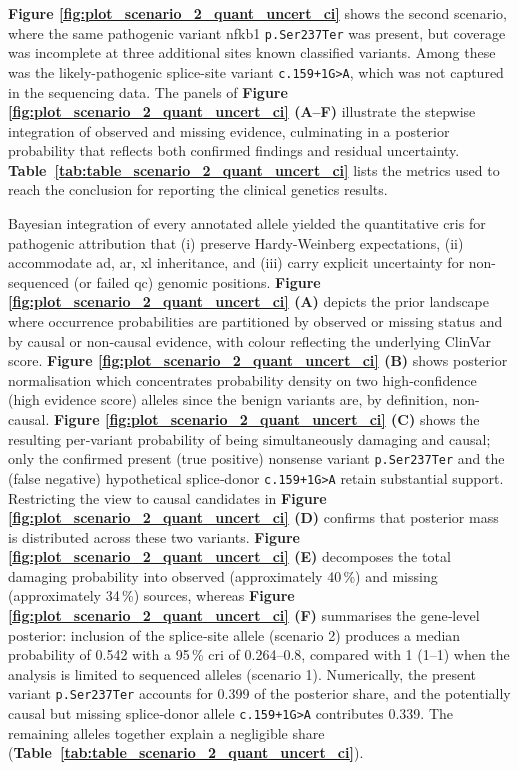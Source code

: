 \textbf{Figure \ref{fig:plot_scenario_2_quant_uncert_ci}} shows the second scenario, where the same pathogenic variant \ac{nfkb1} \texttt{p.Ser237Ter} was present, but coverage was incomplete at three additional sites known classified variants. 
Among these was the likely-pathogenic splice-site variant \texttt{c.159+1G{\small\textgreater}A}, which was not captured in the sequencing data. 
The panels of \textbf{Figure \ref{fig:plot_scenario_2_quant_uncert_ci} (A–F)} illustrate the stepwise integration of observed and missing evidence, culminating in a posterior probability that reflects both confirmed findings and residual uncertainty.
\textbf{Table~\ref{tab:table_scenario_2_quant_uncert_ci}} lists the metrics used to reach the conclusion for reporting the clinical genetics results.

Bayesian integration of every annotated allele yielded the quantitative \ac{cri}s for pathogenic attribution that (i) preserve Hardy-Weinberg expectations, (ii) accommodate \ac{ad}, \ac{ar}, \ac{xl} inheritance, and (iii) carry explicit uncertainty for non-sequenced (or failed \ac{qc}) genomic positions.  
\textbf{Figure \ref{fig:plot_scenario_2_quant_uncert_ci} (A)}
depicts the prior landscape where occurrence probabilities are partitioned by observed or missing status and by causal or non‑causal evidence, with colour reflecting the underlying ClinVar score.  
\textbf{Figure \ref{fig:plot_scenario_2_quant_uncert_ci} (B)} shows posterior normalisation which concentrates probability density on two high‑confidence (high evidence score) alleles since the benign variants are, by definition, non-causal.
\textbf{Figure \ref{fig:plot_scenario_2_quant_uncert_ci} (C)} shows the resulting per‑variant probability of being simultaneously damaging and causal; only the confirmed present (true positive) nonsense variant \texttt{p.Ser237Ter} and the (false negative) hypothetical splice‑donor \texttt{c.159+1G{\small\textgreater}A} retain substantial support. 
Restricting the view to causal candidates in 
\textbf{Figure \ref{fig:plot_scenario_2_quant_uncert_ci} (D)} 
confirms that posterior mass is distributed across these two variants. 
\textbf{Figure \ref{fig:plot_scenario_2_quant_uncert_ci} (E)} decomposes the total damaging probability into observed (approximately 40\,\%) and missing (approximately 34\,\%) sources, whereas \textbf{Figure \ref{fig:plot_scenario_2_quant_uncert_ci} (F)} summarises the gene‑level posterior: inclusion of the splice‑site allele (scenario 2) produces a median probability of 0.542 with a 95\,\% \ac{cri} of 0.264–0.8, compared with 1 (1–1) when the analysis is limited to sequenced alleles (scenario 1). Numerically, the present variant \texttt{p.Ser237Ter} accounts for 0.399 of the posterior share, and the potentially causal but missing splice‑donor allele \texttt{c.159+1G{\small\textgreater}A} contributes 0.339. The remaining alleles together explain a negligible share (\textbf{Table~\ref{tab:table_scenario_2_quant_uncert_ci}}).


